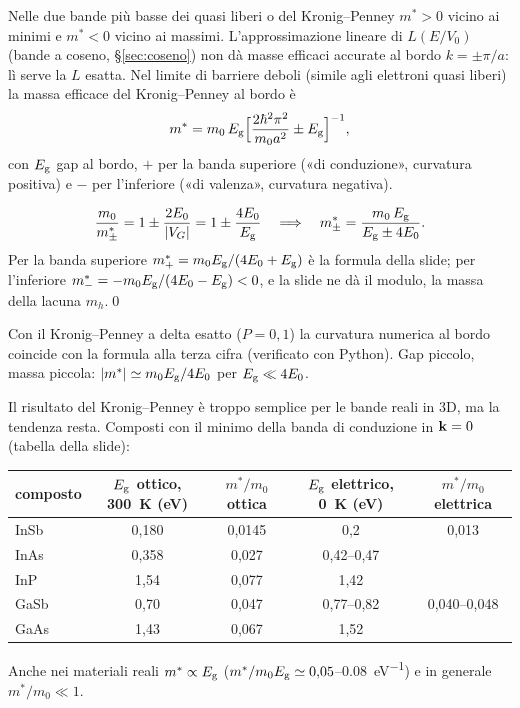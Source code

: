 \documentclass[11pt,a4paper]{article}
\begin{document}
Nelle due bande più basse dei quasi liberi o del Kronig--Penney $m^*>0$ vicino ai minimi e $m^*<0$ vicino ai massimi. L'approssimazione lineare di
$L(E/V_0)$ (bande a coseno, §\ref{sec:coseno}) non dà masse efficaci accurate al bordo $k=\pm\pi/a$: lì serve la $L$ esatta. Nel limite di barriere
deboli (simile agli elettroni quasi liberi) la massa efficace del Kronig--Penney al bordo è
\[
m^*=m_0\,E_{\mathrm g}\Bigl[\frac{2\hbar^2\pi^2}{m_0a^2}\pm E_{\mathrm g}\Bigr]^{-1},
\]
con $E_{\mathrm g}$ gap al bordo, $+$ per la banda superiore («di conduzione», curvatura positiva) e $-$ per l'inferiore («di valenza», curvatura negativa).
\begin{dimostrazione}
\[
\frac{m_0}{m^*_\pm}=1\pm\frac{2E_0}{|V_G|}=1\pm\frac{4E_0}{E_{\mathrm g}}\quad\Longrightarrow\quad m^*_\pm=\frac{m_0\,E_{\mathrm g}}{E_{\mathrm g}\pm4E_0}.
\]
Per la banda superiore $m^*_+=m_0E_{\mathrm g}/(4E_0+E_{\mathrm g})$ è la formula della slide; per l'inferiore $m^*_-=-m_0E_{\mathrm g}/(4E_0-E_{\mathrm g})<0$, e la slide ne dà il modulo,
la massa della lacuna $m_h$.\qed
\end{dimostrazione}
Con il Kronig--Penney a delta esatto ($P=0{,}1$) la curvatura numerica al bordo coincide con la formula alla terza cifra (verificato con Python). Gap
piccolo, massa piccola: $|m^*|\simeq m_0E_{\mathrm g}/4E_0$ per $E_{\mathrm g}\ll4E_0$.

Il risultato del Kronig--Penney è troppo semplice per le bande reali in 3D, ma la tendenza resta. Composti con il minimo della banda di conduzione in
$\mathbf k=0$ (tabella della slide):
\begin{center}\small
\begin{tabular}{@{}lcccc@{}}
\toprule
composto & $E_{\mathrm g}$ ottico, \SI{300}{K} (eV) & $m^*/m_0$ ottica & $E_{\mathrm g}$ elettrico, \SI{0}{K} (eV) & $m^*/m_0$ elettrica\\
\midrule
InSb & 0,180 & 0,0145 & 0,2 & 0,013\\
InAs & 0,358 & 0,027 & 0,42--0,47 & \\
InP & 1,54 & 0,077 & 1,42 & \\
GaSb & 0,70 & 0,047 & 0,77--0,82 & 0,040--0,048\\
GaAs & 1,43 & 0,067 & 1,52 & \\
\bottomrule
\end{tabular}
\end{center}
Anche nei materiali reali $m^*\propto E_{\mathrm g}$ ($m^*/m_0E_{\mathrm g}\simeq0{,}05$--\SI{0.08}{eV^{-1}}) e in generale $m^*/m_0\ll1$.
\end{document}
